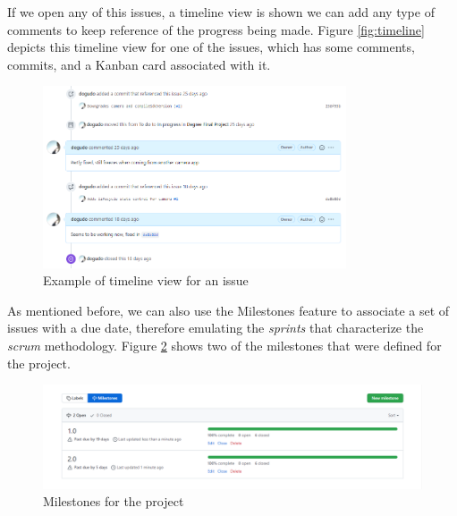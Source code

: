 If we open any of this issues, a timeline view is shown we can add any type of comments to keep reference of the progress being made. Figure \ref{fig:timeline} depicts this timeline view for one of the issues, which has some comments, commits, and a Kanban card associated with it.

\begin{figure}[h]
  \centering
  \includegraphics[width=0.8\textwidth]{Figures/issue_timeline.png}
  \caption{%
    Example of timeline view for an issue
  }
  \label{fig:issue-timeline}
\end{figure}

As mentioned before, we can also use the Milestones feature to associate a set of issues with a due date, therefore emulating the \textit{sprints} that characterize the \textit{scrum} methodology. Figure \ref{fig:milestones} shows two of the milestones that were defined for the project.

\begin{figure}[h]
  \centering
  \includegraphics[width=\textwidth]{Figures/milestones.png}
  \caption{%
    Milestones for the project
  }
  \label{fig:milestones}
\end{figure}